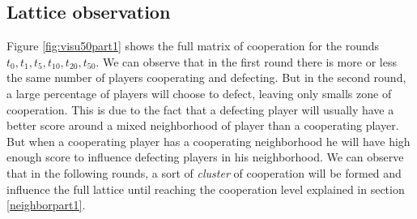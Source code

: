 \documentclass[letterpaper]{article}
\begin{document}
\subsection{Lattice observation}

Figure \ref{fig:visu50part1} shows the full matrix of cooperation for
the rounds $t_{0}, t_{1}, t_{5}, t_{10}, t_{20}, t_{50}$. We can observe
that in the first round there is more or less the same number of players
cooperating and defecting. But in the second round, a large percentage
of players will choose to defect, leaving only smalls zone of cooperation.
This is due to the fact that a defecting player will usually have a better
score around a mixed neighborhood of player than a cooperating player.
But when a cooperating player has a cooperating neighborhood he will have
high enough score to influence defecting players in his neighborhood. We can
observe that in the following rounds, a sort of \textit{cluster} of cooperation
will be formed and influence the full lattice until reaching the cooperation
level explained in section \ref{neighborpart1}.
\end{document}
